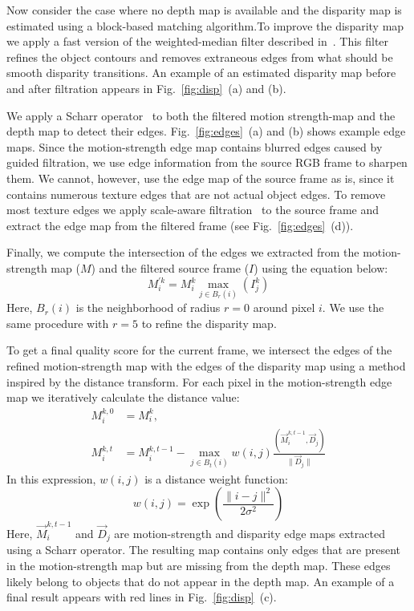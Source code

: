 \documentclass[14pt, a4paper]{extarticle}
\begin{document}
Now consider the case where no depth map is available and the disparity map is estimated using 
a block-based matching algorithm.To improve the disparity map we apply a fast version of 
the weighted-median filter described in~\cite{zhang2014100+}. This filter refines the object contours 
and removes extraneous edges from what should be smooth disparity transitions. An example of an estimated 
disparity map before and after filtration appears in Fig.~\ref{fig:disp}~(a) and (b).

We apply a Scharr operator~\cite{jahne1999principles} to both the filtered motion strength-map 
and the depth map to detect their edges. Fig.~\ref{fig:edges}~(a) and (b) shows example edge maps. 
Since the motion-strength edge map contains blurred edges caused by guided filtration, we use 
edge information from the source RGB frame to sharpen them. We cannot, however, use the edge map 
of the source frame as is, since it contains numerous texture edges that are not actual object edges. 
To remove most texture edges we apply scale-aware filtration~\cite{zhang2014rolling} to the source 
frame and extract the edge map from the filtered frame (see Fig.~\ref{fig:edges}~(d)).

Finally, we compute the intersection of the edges we extracted from the motion-strength map ($M$) 
and the filtered source frame ($I$) using the equation below:
\begin{equation}
M_i^{'k} =M_i^k\max_{j  \in B_{r}(i)}(I_j^k)
\end{equation}
Here, $B_{r}(i)$ is the neighborhood of radius $r = 0$ around pixel $i$. We use the same procedure 
with $r = 5$ to refine the disparity map.

To get a final quality score for the current frame, we intersect the edges of the refined motion-strength map 
with the edges of the disparity map using a method inspired by the distance transform. For each pixel 
in the motion-strength edge map we iteratively calculate the distance value:
\begin{equation}
\begin{split}
M_i^{k,0} &= M_i^k, \\
M_i^{k,t} &= M_i^{k,t-1} - \max_{j \in B_t(i)}w(i,j)\frac{\left(\vec{M}_i^{k,t-1}, \vec{D}_j  \right)}{\lVert\vec{D}_j\rVert}
\end{split}
\end{equation}
In this expression, $w(i,j)$ is a distance weight function:
\begin{equation}
w(i,j) = \exp\left(\frac{\lVert i-j \rVert^2}{2\sigma^2}\right)
\end{equation}
Here, $\vec{M}_i^{k,t-1}$ and $\vec{D}_j$ are motion-strength and disparity edge maps extracted using 
a Scharr operator. The resulting map contains only edges that are present in the motion-strength map 
but are missing from the depth map. These edges likely belong to objects that do not appear in the depth map. 
An example of a final result appears with red lines in Fig.~\ref{fig:disp}~(c).
\end{document}
